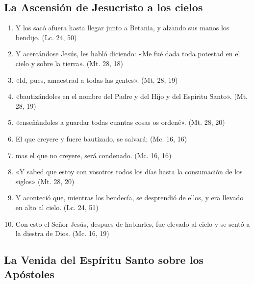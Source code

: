 \documentclass[a4paper,11pt]{article}
\begin{document}
    \subsection*{\hfil La Ascensión de Jesucristo a los cielos \hfil}
        
      \begin{enumerate} 
        \item Y los sacó afuera hasta llegar junto a Betania, y alzando sus manos los bendijo. (Lc. 24, 50)

        \item Y acercándose Jesús, les habló diciendo: «Me fué dada toda potestad en el cielo y sobre la tierra». (Mt. 28, 18)

        \item «Id, pues, amaestrad a todas las gentes». (Mt. 28, 19)

        \item «bautizándoles en el nombre del Padre y del Hijo y del Espíritu Santo». (Mt. 28, 19)

        \item «enseñándoles a guardar todas cuantas cosas os ordené». (Mt. 28, 20)

        \item El que creyere y fuere bautizado, se salvará; (Mc. 16, 16)

        \item mas el que no creyere, será condenado. (Mc. 16, 16)

        \item «Y sabed que estoy con vosotros todos los días hasta la consumación de los siglos» (Mt. 28, 20)

        \item Y aconteció que, mientras los bendecía, se desprendió de ellos, y era llevado en alto al cielo. (Lc. 24, 51)

        \item Con esto el Señor Jesús, despues de hablarles, fue elevado al cielo y se sentó a la diestra de Dios. (Mc. 16, 19)

      \end{enumerate}

    \subsection*{\hfil La Venida del Espíritu Santo sobre los Apóstoles \hfil}
\end{document}
